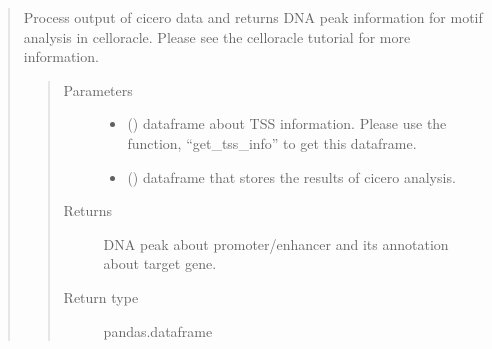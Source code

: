 \documentclass[letterpaper,10pt,english]{sphinxmanual}
\begin{document}
\begin{quote}
\begin{fulllineitems}
\label{\detokenize{modules/celloracle.motif_analysis:celloracle.motif_analysis.integrate_tss_peak_with_cicero}}
Process output of cicero data and returns DNA peak information for motif analysis in celloracle.
Please see the celloracle tutorial for more information.
\begin{quote}\begin{description}
\item[{Parameters}] \leavevmode\begin{itemize}
\item {} 
 () \textendash{} dataframe about TSS information. Please use the function, “get\_tss\_info” to get this dataframe.

\item {} 
 () \textendash{} dataframe that stores the results of cicero analysis.

\end{itemize}

\item[{Returns}] \leavevmode
DNA peak about promoter/enhancer and its annotation about target gene.

\item[{Return type}] \leavevmode
pandas.dataframe

\end{description}\end{quote}

\end{fulllineitems}

\end{quote}
\end{document}
